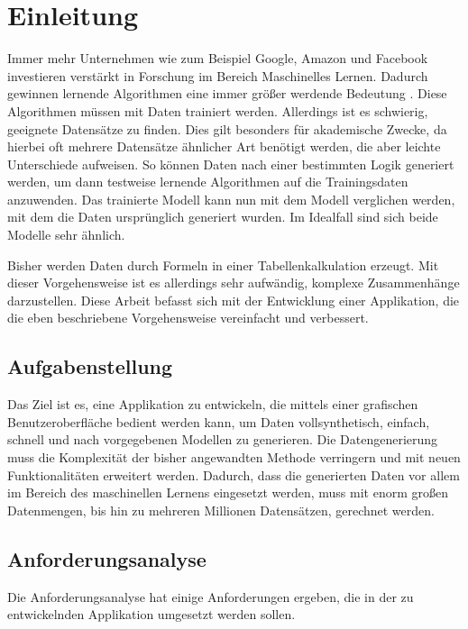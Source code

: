 
\chapter{Einleitung}

Immer mehr Unternehmen wie zum Beispiel Google, Amazon und Facebook investieren verstärkt in Forschung im Bereich Maschinelles Lernen. Dadurch gewinnen lernende Algorithmen eine immer größer werdende Bedeutung \cite{mengesonnentag:2018}. Diese Algorithmen müssen mit Daten trainiert werden. Allerdings ist es schwierig, geeignete Datensätze zu finden. Dies gilt besonders für akademische Zwecke, da hierbei oft mehrere Datensätze ähnlicher Art benötigt werden, die aber leichte Unterschiede aufweisen. So können Daten nach einer bestimmten Logik generiert werden, um dann testweise lernende Algorithmen auf die Trainingsdaten anzuwenden. Das trainierte Modell kann nun mit dem Modell verglichen werden, mit dem die Daten ursprünglich generiert wurden. Im Idealfall sind sich beide Modelle sehr ähnlich.

Bisher werden Daten durch Formeln in einer Tabellenkalkulation erzeugt. Mit dieser Vorgehensweise ist es allerdings sehr aufwändig, komplexe Zusammenhänge darzustellen. Diese Arbeit befasst sich mit der Entwicklung einer Applikation, die die eben beschriebene Vorgehensweise vereinfacht und verbessert.

\section{Aufgabenstellung}

Das Ziel ist es, eine Applikation zu entwickeln, die mittels einer grafischen Benutzeroberfläche bedient werden kann, um Daten vollsynthetisch, einfach, schnell und nach vorgegebenen Modellen zu generieren. Die Datengenerierung muss die Komplexität der bisher angewandten Methode verringern und mit neuen Funktionalitäten erweitert werden. Dadurch, dass die generierten Daten vor allem im Bereich des maschinellen Lernens eingesetzt werden, muss mit enorm großen Datenmengen, bis hin zu mehreren Millionen  Datensätzen, gerechnet werden.

\section{Anforderungsanalyse}
\label{sec:anforderungsanalyse}

Die Anforderungsanalyse hat einige Anforderungen ergeben, die in der zu entwickelnden Applikation umgesetzt werden sollen.

